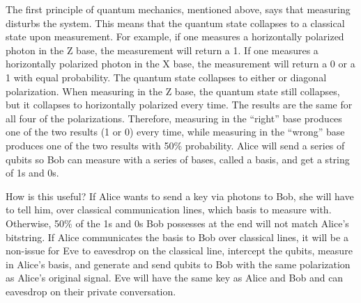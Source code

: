 \documentclass[12pt,twocolumn]{article}
\begin{document}

The first principle of quantum mechanics, mentioned above, says that measuring disturbs the system. This means that the quantum state collapses to a classical state upon measurement. For example, if one measures a horizontally polarized photon in the Z base, the measurement will return a 1. If one measures a horizontally polarized photon in the X base, the measurement will return a 0 or a 1 with equal probability. The quantum state collapses to either  or  diagonal polarization. When measuring in the Z base, the quantum state still collapses, but it collapses to horizontally polarized every time. The results are the same for all four of the polarizations. Therefore, measuring in the ``right” base produces one of the two results (1 or 0) every time, while measuring in the ``wrong” base produces one of the two results with 50\% probability. Alice will send a series of qubits so Bob can measure with a series of bases, called a basis, and get a string of 1s and 0s.

How is this useful? If Alice wants to send a key via photons to Bob, she will have to tell him, over classical communication lines, which basis to measure with. Otherwise, 50\% of the 1s and 0s Bob possesses at the end will not match Alice's bitstring. If Alice communicates the basis to Bob over classical lines, it will be a non-issue for Eve to eavesdrop on the classical line, intercept the qubits, measure in Alice's basis, and generate and send qubits to Bob with the same polarization as Alice's original signal. Eve will have the same key as Alice and Bob and can eavesdrop on their private conversation.
\end{document}
